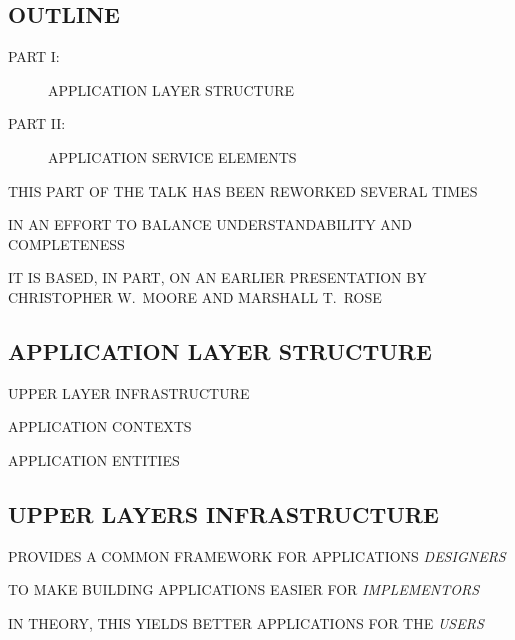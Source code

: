 


\begin{bwslide}
\part*	{OUTLINE}\bf

\begin{description}
\item[PART I:]		APPLICATION LAYER STRUCTURE

\item[PART II:]		APPLICATION SERVICE ELEMENTS
\end{description}
\end{bwslide}


\begin{bwslide}

\begin{nrtc}
\item	THIS PART OF THE TALK HAS BEEN REWORKED SEVERAL TIMES

\item	IN AN EFFORT TO BALANCE UNDERSTANDABILITY AND COMPLETENESS

\item	IT IS BASED, IN PART, ON AN EARLIER PRESENTATION BY
	CHRISTOPHER W.~MOORE AND MARSHALL T.~ROSE
\end{nrtc}
\end{bwslide}


\begin{bwslide}
\part	{APPLICATION LAYER STRUCTURE}\bf

\begin{nrtc}
\item	UPPER LAYER INFRASTRUCTURE

\item	APPLICATION CONTEXTS

\item	APPLICATION ENTITIES
\end{nrtc}
\end{bwslide}


\begin{bwslide}
\part*	{UPPER LAYERS INFRASTRUCTURE}\bf

\begin{nrtc}
\item	PROVIDES A COMMON FRAMEWORK FOR APPLICATIONS \emph{DESIGNERS}

\item	TO MAKE BUILDING APPLICATIONS EASIER FOR \emph{IMPLEMENTORS}

\item	IN THEORY, THIS YIELDS BETTER APPLICATIONS FOR THE \emph{USERS}
\end{nrtc}
\end{bwslide}


